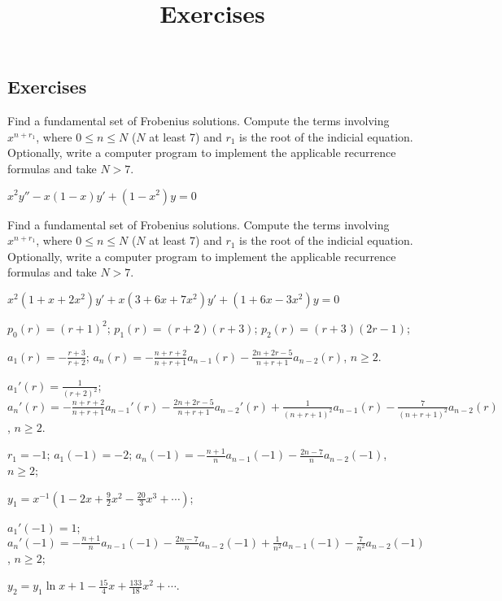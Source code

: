 \documentclass{ximera}
\title{Exercises} \license{CC BY-NC-SA 4.0}
\begin{document}
\begin{abstract}
\end{abstract}
\maketitle

\begin{onlineOnly}
\section*{Exercises}
\end{onlineOnly}

\begin{problem}\label{exer:7.6.1}
Find a fundamental set of Frobenius solutions. Compute the terms involving $x^{n+r_1}$, where $0\leq n \leq N$ ($N$ at least 7) and $r_1$ is the root of the indicial equation. Optionally, write a computer
program to implement the applicable recurrence formulas and take $N > 7$.

$x^2y''-x(1-x)y'+(1-x^2)y=0$
\end{problem}

\begin{problem}\label{exer:7.6.2}
Find a fundamental set of Frobenius solutions. Compute the terms involving $x^{n+r_1}$, where $0\leq n \leq N$ ($N$ at least 7) and $r_1$ is the root of the indicial equation. Optionally, write a computer
program to implement the applicable recurrence formulas and take $N > 7$.

$x^2(1+x+2x^2)y'+x(3+6x+7x^2)y'+(1+6x-3x^2)y=0$

\begin{solution}
    $p_0(r)=(r+1)^2$;
$p_1(r)=(r+2)(r+3)$;
$p_2(r)=(r+3)(2r-1)$;

$a_1(r)=-\frac{r+3}{ r+2}$;
$a_n(r)=-\frac{n+r+2}{ n+r+1}a_{n-1}(r)-\frac{2n+2r-5}{
n+r+1}a_{n-2}(r)$,
$n\geq 2$.

$a_1'(r)=\frac{1}{(r+2)^2}$;
$a_n'(r)=-\frac{n+r+2}{ n+r+1}a_{n-1}'(r)-\frac{2n+2r-5}{
n+r+1}a_{n-2}'(r)+\frac{1}{(n+r+1)^2}a_{n-1}(r)-\frac{7}{(n+r+1)^2}a_{n-2}(r)$,
$n\geq 2$.

$r_1=-1$;
$a_1(-1)=-2$;
$a_n(-1)=-\frac{n+1}{ n}a_{n-1}(-1)-\frac{2n-7}{ n}a_{n-2}(-1)$,
$n\geq 2$;

$y_1=x^{-1}\left(1-2x+\frac{9}{2}x^2-\frac{20}{3}x^3+\cdots\right)$;

$a_1'(-1)=1$;
$a_n'(-1)=-\frac{n+1}{ n}a_{n-1}(-1)-\frac{2n-7}{ n}a_{n-2}(-1)
+\frac{1}{ n^2}a_{n-1}(-1)-\frac{7}{ n^2}a_{n-2}(-1)$,
$n\geq 2$;

$y_2=
y_1\ln x+1-\frac{15}{4}x+\frac{133}{18}x^2+\cdots$.
\end{solution}
\end{problem}
\end{document}
